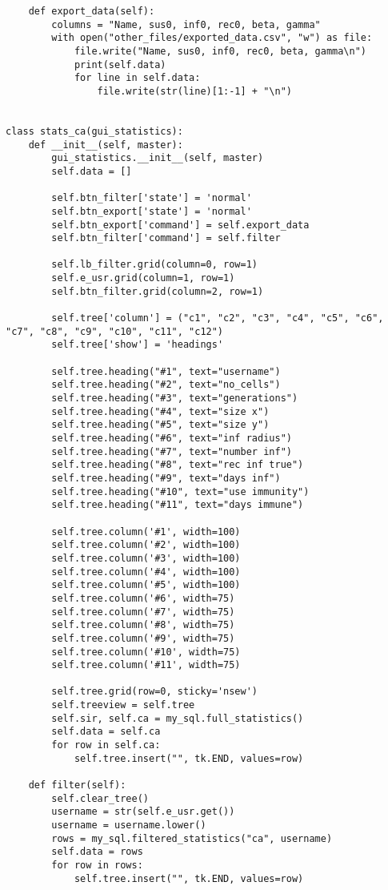 \documentclass[11pt, a4paper]{article}
\begin{document}
\begin{lstlisting}
    def export_data(self):
        columns = "Name, sus0, inf0, rec0, beta, gamma"
        with open("other_files/exported_data.csv", "w") as file:
            file.write("Name, sus0, inf0, rec0, beta, gamma\n")
            print(self.data)
            for line in self.data:
                file.write(str(line)[1:-1] + "\n")


class stats_ca(gui_statistics):
    def __init__(self, master):
        gui_statistics.__init__(self, master)
        self.data = []

        self.btn_filter['state'] = 'normal'
        self.btn_export['state'] = 'normal'
        self.btn_export['command'] = self.export_data
        self.btn_filter['command'] = self.filter

        self.lb_filter.grid(column=0, row=1)
        self.e_usr.grid(column=1, row=1)
        self.btn_filter.grid(column=2, row=1)

        self.tree['column'] = ("c1", "c2", "c3", "c4", "c5", "c6", "c7", "c8", "c9", "c10", "c11", "c12")
        self.tree['show'] = 'headings'

        self.tree.heading("#1", text="username")
        self.tree.heading("#2", text="no_cells")
        self.tree.heading("#3", text="generations")
        self.tree.heading("#4", text="size x")
        self.tree.heading("#5", text="size y")
        self.tree.heading("#6", text="inf radius")
        self.tree.heading("#7", text="number inf")
        self.tree.heading("#8", text="rec inf true")
        self.tree.heading("#9", text="days inf")
        self.tree.heading("#10", text="use immunity")
        self.tree.heading("#11", text="days immune")

        self.tree.column('#1', width=100)
        self.tree.column('#2', width=100)
        self.tree.column('#3', width=100)
        self.tree.column('#4', width=100)
        self.tree.column('#5', width=100)
        self.tree.column('#6', width=75)
        self.tree.column('#7', width=75)
        self.tree.column('#8', width=75)
        self.tree.column('#9', width=75)
        self.tree.column('#10', width=75)
        self.tree.column('#11', width=75)

        self.tree.grid(row=0, sticky='nsew')
        self.treeview = self.tree
        self.sir, self.ca = my_sql.full_statistics()
        self.data = self.ca
        for row in self.ca:
            self.tree.insert("", tk.END, values=row)

    def filter(self):
        self.clear_tree()
        username = str(self.e_usr.get())
        username = username.lower()
        rows = my_sql.filtered_statistics("ca", username)
        self.data = rows
        for row in rows:
            self.tree.insert("", tk.END, values=row)


\end{lstlisting}
\end{document}
